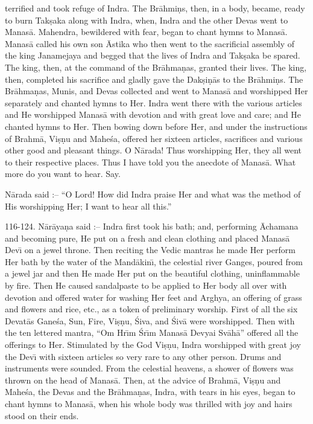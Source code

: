 terrified and took refuge of Indra. The Br\=ahmi\d{n}s, then, in a body, became, ready to burn Tak\d{s}aka along with Indra, when, Indra and the other Devas went to Manas\=a. Mahendra, bewildered with fear, began to chant hymns to Manas\=a. Manas\=a called his own son \=Astika who then went to the sacrificial assembly of the king Janamejaya and begged that the lives of Indra and Tak\d{s}aka be spared. The king, then, at the command of the Br\=ahma\d{n}as, granted their lives. The king, then, completed his sacrifice and gladly gave the Dak\d{s}i\d{n}\=as to the Br\=ahmi\d{n}s. The Br\=ahma\d{n}as, Munis, and Devas collected and went to Manas\=a and worshipped Her separately and chanted hymns to Her. Indra went there with the various articles and He worshipped Manas\=a with devotion and with great love and care; and He chanted hymns to Her. Then bowing down before Her, and under the instructions of Brahm\=a, Vi\d{s}\d{n}u and Mahe\'sa, offered her sixteen articles, sacrifices and various other good and pleasant things. O N\=arada! Thus worshipping Her, they all went to their respective places. Thus I have told you the anecdote of Manas\=a. What more do you want to hear. Say.

N\=arada said :-- ``O Lord! How did Indra praise Her and what was the method of His worshipping Her; I want to hear all this.''

116-124. N\=ar\=aya\d{n}a said :-- Indra first took his bath; and, performing \=Achamana and becoming pure, He put on a fresh and clean clothing and placed Manas\=a Dev\={\i} on a jewel throne. Then reciting the Vedic mantras he made Her perform Her bath by the water of the Mand\=akin\={\i}, the celestial river Ganges, poured from a jewel jar and then He made Her put on the beautiful clothing, uninflammable by fire. Then He caused sandalpaste to be applied to Her body all over with devotion and offered water for washing Her feet and Arghya, an offering of grass and flowers and rice, etc., as a token of preliminary worship. First of all the six Devat\=as Gane\'sa, Sun, Fire, Vi\d{s}\d{n}u, \'Siva, and \'Siv\=a were worshipped. Then with the ten lettered mantra, ``Om Hr\={\i}m \'Sr\={\i}m Manas\=a Devyai Sv\=ah\=a'' offered all the offerings to Her. Stimulated by the God Vi\d{s}\d{n}u, Indra worshipped with great joy the Dev\={\i} with sixteen articles so very rare to any other person. Drums and instruments were sounded. From the celestial heavens, a shower of flowers was thrown on the head of Manas\=a. Then, at the advice of Brahm\=a, Vi\d{s}\d{n}u and Mahe\'sa, the Devas and the Br\=ahma\d{n}as, Indra, with tears in his eyes, began to chant hymns to Manas\=a, when his whole body was thrilled with joy and hairs stood on their ends.

